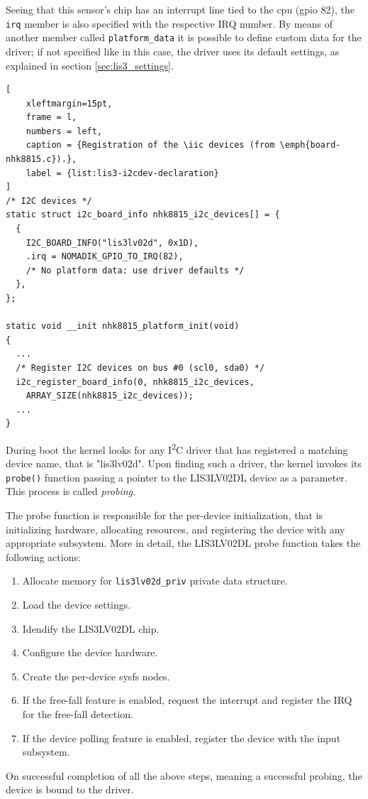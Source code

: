 \documentclass[a4paper,10pt]{article}
\newenvironment{packedenum}{
\begin{enumerate}
  \setlength{\itemsep}{3pt}
  \setlength{\parskip}{0pt}
  \setlength{\parsep}{0pt}
}{\end{enumerate}}
\newcommand{\iic}{I\textsuperscript{2}C }
\newcommand{\keyword}[1]{\texttt{#1}}
\begin{document}
\begin{multicols}{2}
Seeing that this sensor's chip has an interrupt line tied to the cpu (gpio 82),
the \keyword{irq} member is also specified with the respective IRQ number.
By means of another member called \keyword{platform\_data} it is possible to
define custom data for the driver; if not specified like in this case, the
driver uses its default settings, as explained in section
\ref{sec:lis3_settings}.

\begin{lstlisting}[
	xleftmargin=15pt,
	frame = l,
	numbers = left,
	caption = {Registration of the \iic devices (from \emph{board-nhk8815.c}).},
	label = {list:lis3-i2cdev-declaration}
]
/* I2C devices */
static struct i2c_board_info nhk8815_i2c_devices[] = {
  {
    I2C_BOARD_INFO("lis3lv02d", 0x1D),
    .irq = NOMADIK_GPIO_TO_IRQ(82),
    /* No platform data: use driver defaults */
  },
};

static void __init nhk8815_platform_init(void)
{
  ...
  /* Register I2C devices on bus #0 (scl0, sda0) */
  i2c_register_board_info(0, nhk8815_i2c_devices,
    ARRAY_SIZE(nhk8815_i2c_devices));
  ...
}
\end{lstlisting}

During boot the kernel looks for any \iic driver that has registered a matching
device name, that is "lis3lv02d". Upon finding such a driver, the kernel
invokes its \keyword{probe()} function passing a pointer to the LIS3LV02DL
device as a parameter. This process is called \emph{probing}.

The probe function is responsible for the per-device initialization, that is
initializing hardware, allocating resources, and registering the device with
any appropriate subsystem. More in detail, the LIS3LV02DL probe function
takes the following actions:
\begin{packedenum}
	\item Allocate memory for \keyword{lis3lv02d\_priv} private data structure.
	\item Load the device settings.
	\item Idendify the LIS3LV02DL chip.
	\item Configure the device hardware.
	\item Create the per-device sysfs nodes.
	\item If the free-fall feature is enabled, request the interrupt and
		register the IRQ for the free-fall detection.
	\item If the device polling feature is enabled, register the device with
		the input subsystem.
\end{packedenum}
On successful completion of all the above steps, meaning a successful probing,
the device is bound to the driver.



\end{multicols}
\end{document}
